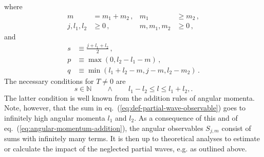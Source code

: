 \documentclass[aps,nofootinbib,preprintnumbers,prd,twocolumn]{revtex4-1}
\newcommand{\refeq}[1]{eq.~(\ref{eq:#1})}
\begin{document}
where
\begin{equation}
\begin{aligned}
    m & = m_1 + m_2\,, &
    m_1 & \geq m_2\,,  \\
    j, l_1, l_2 & \geq 0\,, &
    m, m_1, m_2 & \geq 0\,,
\end{aligned}
\end{equation}
and
\begin{equation}
\begin{aligned}
    s & \equiv \frac{j + l_1 + l_2}{2}\,, \\
    p & \equiv \max(0, l_2 - l_1 - m)\,, \\
    q & \equiv \min(l_1 + l_2 - m, j - m, l_2 - m_2)\,.
\end{aligned}
\end{equation}
The necessary conditions for $T \neq 0$ are
\begin{equation}
    \label{eq:angular-momentum-addition}
    s \in \mathbb{N}\qquad \wedge \qquad l_1 - l_2 \leq l \leq l_1 + l_2,.
\end{equation}
The latter condition is well known from the addition rules of angular momenta. Note, however, that
the sum in \refeq{def-partial-wave-observable} goes to infinitely high angular momenta $l_1$ and $l_2$. As a consequence
of this and of \refeq{angular-momentum-addition}, the angular observables $S_{j,m}$
consist of sums with infinitely many terms. It is then up to theoretical analyses to
estimate or calculate the impact of the neglected partial waves, e.g. as outlined above.



\end{document}
